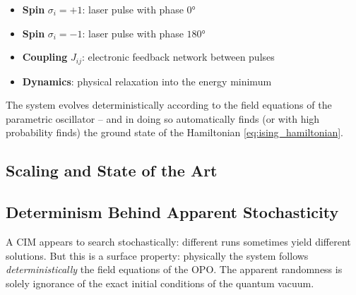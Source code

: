 \begin{itemize}
    \item \textbf{Spin} $\sigma_i = +1$: laser pulse with phase $0°$
    \item \textbf{Spin} $\sigma_i = -1$: laser pulse with phase $180°$
    \item \textbf{Coupling} $J_{ij}$: electronic feedback network between pulses
    \item \textbf{Dynamics}: physical relaxation into the energy minimum
\end{itemize}

The system evolves deterministically according to the field equations of the
parametric oscillator -- and in doing so automatically finds (or with high probability
finds) the ground state of the Hamiltonian \eqref{eq:ising_hamiltonian}.

\subsection{Scaling and State of the Art}

\begin{table}[h]
    \centering
    \caption{Comparison: Classical computer vs.\ Coherent Ising Machine}
    \label{tab:cim_vs_classical}
\end{table}

\subsection{Determinism Behind Apparent Stochasticity}
\label{subsec:cim_determinism}

A CIM appears to search stochastically: different runs sometimes yield different
solutions. But this is a surface property: physically the system follows
\emph{deterministically} the field equations of the OPO. The apparent randomness
is solely ignorance of the exact initial conditions of the quantum vacuum.

